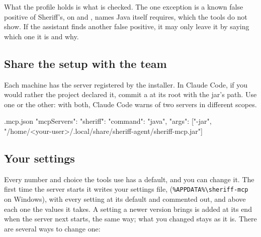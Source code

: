 \documentclass[11pt,a4paper]{article}
\begin{document}
What the profile holds is what is checked. The one exception is a known false
positive of Sheriff's,  on  and
, names Java itself requires, which the tools do not
show. If the assistant finds another false positive, it may only leave it by
saying which one it is and why.

\subsection{Share the setup with the team}

Each machine has the server registered by the installer. In Claude Code, if
you would rather the project declared it, commit a  at its root
with the jar's path. Use one or the other: with both, Claude Code warns of two 
servers in different scopes.

\begin{command}[basicstyle=\ttfamily\footnotesize]{.mcp.json}
{
  "mcpServers": {
    "sheriff": {
      "command": "java",
      "args": ["-jar", "/home/<your-user>/.local/share/sheriff-agent/sheriff-mcp.jar"]
    }
  }
}
\end{command}

\subsection{Your settings}\label{sec:settings}

Every number and choice the tools use has a default, and you can change it. The
first time the server starts it writes your settings file,
\allowbreak{}
(\texttt{\%APPDATA\%\textbackslash sheriff-mcp} on Windows), with every setting at
its default and commented out, and above each one the values it takes. A setting a newer version brings is added at its
end when the server next starts, the same way; what you changed stays as it is.
There are several ways to change one:
\end{document}
